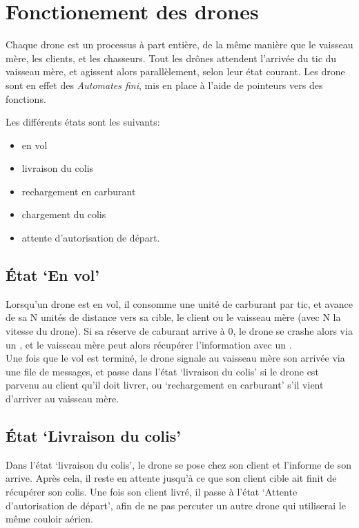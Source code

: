 \chapter{Fonctionement des drones}

Chaque drone est un processus à part entière, de la même manière que le vaisseau mère, les clients, et les chasseurs.
Tout les drônes attendent l'arrivée du tic du vaisseau mère, et agissent alors parallèlement, selon leur état courant.
Les drone sont en effet des \emph{Automates fini}, mis en place à l'aide de pointeurs vers des fonctions.

Les différents états sont les suivants:
\begin{itemize}
    \item en vol
    \item livraison du colis
    \item rechargement en carburant
    \item chargement du colis
    \item attente d'autorisation de départ.
\end{itemize}

\section{État `En vol'}
    Lorsqu'un drone est en vol, il consomme une unité de carburant par tic, et avance de sa N unités de distance vers sa cible,
    le client ou le vaisseau mère (avec N la vitesse du drone).
    Si sa réserve de caburant arrive à \(0\), le drone se crashe alors via un ,
    et le vaisseau mère peut alors récupérer l'information avec un . \\
    Une fois que le vol est terminé, le drone signale au vaisseau mère son arrivée via une file de messages,
    et passe dans l'état `livraison du colis' si le drone est parvenu au client qu'il doit livrer,
    ou `rechargement en carburant' s'il vient d'arriver au vaisseau mère.

\section{État `Livraison du colis'}
    Dans l'état `livraison du colis', le drone se pose chez son client et l'informe de son arrive.
    Après cela, il reste en attente jusqu'à ce que son client cible ait finit de récupérer son colis.
    Une fois son client livré, il passe à l'état `Attente d'autorisation de départ', afin de ne pas
    percuter un autre drone qui utiliserai le même couloir aérien.

